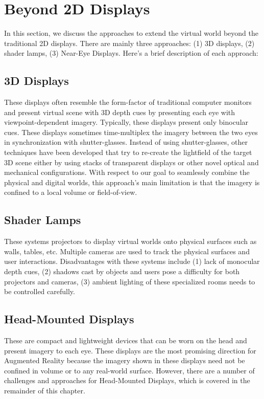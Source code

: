 \section{Beyond 2D Displays}
\label{sec:background:beyond_2d_displays}
In this section, we discuss the approaches to extend the virtual world beyond the traditional 2D displays. 
There are mainly three approaches: (1) 3D displays, (2) shader lamps, (3) Near-Eye Displays. 
Here’s a brief description of each approach:

\subsection{3D Displays}
\label{sec:background:3d_displays}
These displays often resemble the form-factor of traditional computer monitors and present virtual scene with 3D depth cues by presenting each eye with viewpoint-dependent imagery. 
Typically, these displays present only binocular cues. 
These displays sometimes time-multiplex the imagery between the two eyes in synchronization with shutter-glasses. 
Instead of using shutter-glasses, other techniques have been developed that try to re-create the lightfield of the target 3D scene either by using stacks of transparent displays or other novel optical and mechanical configurations. 
With respect to our goal to seamlessly combine the physical and digital worlds, this approach’s main limitation is that the imagery is confined to a local volume or field-of-view.

\subsection{Shader Lamps}
\label{sec:background:shader_lamps}
These systems projectors to display virtual worlds onto physical surfaces such as walls, tables, etc. 
Multiple cameras are used to track the physical surfaces and user interactions. 
Disadvantages with these systems include 
(1) lack of monocular depth cues, 
(2) shadows cast by objects and users pose a difficulty for both projectors and cameras, 
(3) ambient lighting of these specialized rooms needs to be controlled carefully.

\subsection{Head-Mounted Displays}
These are compact and lightweight devices that can be worn on the head and present imagery to each eye. 
These displays are the most promising direction for Augmented Reality because the imagery shown in these displays need not be confined in volume or to any real-world surface. 
However, there are a number of challenges and approaches for Head-Mounted Displays, which is covered in the remainder of this chapter.


